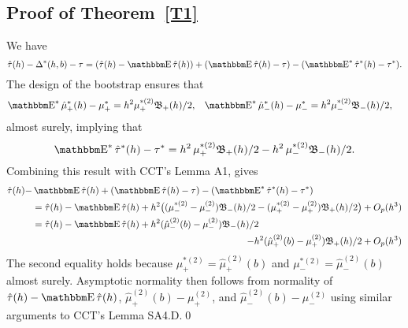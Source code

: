 \documentclass[12pt,fleqn]{article}
\begin{document}
\subsection{Proof of Theorem~\ref{T1}}
We have
\begin{equation*}
  \hat\tau(h) - \Delta^*(h,b) - \tau = (\hat\tau(h) - \E \hat \tau(h)) +
  (\E \hat \tau(h) - \tau) - (\E^* \hat \tau^*(h) - \tau^*).
\end{equation*}
The design of the bootstrap ensures that
\begin{align*}
  \E^* \hat\mu_{+}^*(h) - \mu_{+}^{*}
  &= h^{2} \mu_+^{*(2)} \Bf_{+}(h)/2,
  &\E^* \hat\mu_{-}^*(h) - \mu_{-}^{*}
  &= h^{2} \mu_-^{*(2)} \Bf_{-}(h)/2,
\end{align*}
almost surely, implying that
\begin{equation}
  \label{eq:7}
  \E^* \hat\tau^*(h) - \tau^{*} = h^2\, \mu_+^{*(2)} \Bf_+(h)/2
  - h^2\, \mu_{-}^{*(2)} \Bf_{-}(h)/2.
\end{equation}
Combining this result with CCT's Lemma A1, gives
\begin{align}
  \hat\tau(h) - & \E \hat\tau(h) + (\E \hat\tau(h) - \tau) - (\E^* \hat\tau^*(h) - \tau^*)\notag \\
  &= \hat\tau(h) - \E\hat\tau(h)
   + h^2 \big((\mu_{-}^{*(2)} - \mu_{-}^{(2)}) \Bf_{-}(h) /2
   - (\mu_+^{*(2)}-\mu_+^{(2)}) \Bf_{+}(h) / 2 \big) + O_p(h^{3}) \notag \\
  \label{eq:8}
  &= \hat\tau(h) - \E\hat\tau(h)
   + h^2 (\hat\mu_-^{(2)}(b) - \mu_-^{(2)}) \Bf_{-}(h) /2 \\
  \notag
  &\pushright{- h^2 (\hat\mu_+^{(2)}(b) - \mu_+^{(2)}) \Bf_{+}(h) / 2 + O_p(h^{3})}
\end{align}
The second equality holds because
$\mu_+^{*(2)} = \hat\mu_{+}^{(2)}(b)$ and
$\mu_-^{*(2)} = \hat\mu_{-}^{(2)}(b)$ almost surely. Asymptotic
normality then follows from normality of $\hat\tau(h) - \E\hat\tau(h)$,
$\hat\mu_+^{(2)}(b) - \mu_+^{(2)}$, and
$\hat\mu_-^{(2)}(b) - \mu_-^{(2)}$ using similar arguments to
CCT's Lemma SA4.D.\qed
\end{document}
